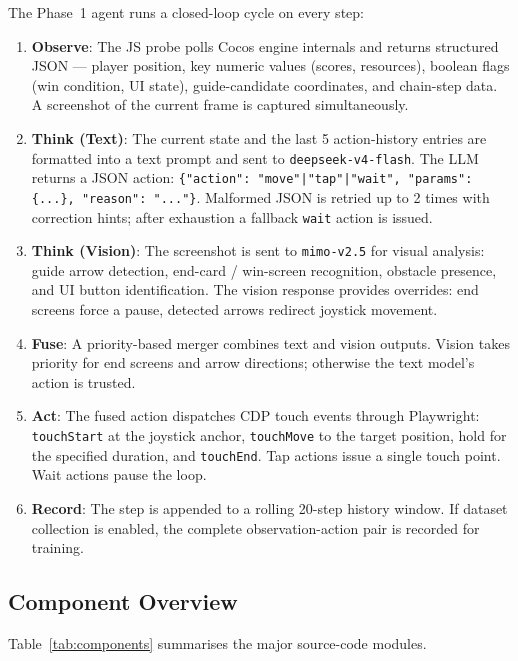 \documentclass[11pt,a4paper]{article}
\begin{document}
The Phase~1 agent runs a closed-loop cycle on every step:

\begin{enumerate}[leftmargin=*,itemsep=2pt]
  \item \textbf{Observe}: The JS probe polls Cocos engine internals and returns structured JSON — player position, key numeric values (scores, resources), boolean flags (win condition, UI state), guide-candidate coordinates, and chain-step data. A screenshot of the current frame is captured simultaneously.
  \item \textbf{Think (Text)}: The current state and the last 5 action-history entries are formatted into a text prompt and sent to \texttt{deepseek-v4-flash}. The LLM returns a JSON action: \texttt{\{"action": "move"|"tap"|"wait", "params": \{...\}, "reason": "..."\}}. Malformed JSON is retried up to 2 times with correction hints; after exhaustion a fallback \texttt{wait} action is issued.
  \item \textbf{Think (Vision)}: The screenshot is sent to \texttt{mimo-v2.5} for visual analysis: guide arrow detection, end-card / win-screen recognition, obstacle presence, and UI button identification. The vision response provides overrides: end screens force a pause, detected arrows redirect joystick movement.
  \item \textbf{Fuse}: A priority-based merger combines text and vision outputs. Vision takes priority for end screens and arrow directions; otherwise the text model's action is trusted.
  \item \textbf{Act}: The fused action dispatches CDP touch events through Playwright: \texttt{touchStart} at the joystick anchor, \texttt{touchMove} to the target position, hold for the specified duration, and \texttt{touchEnd}. Tap actions issue a single touch point. Wait actions pause the loop.
  \item \textbf{Record}: The step is appended to a rolling 20-step history window. If dataset collection is enabled, the complete observation-action pair is recorded for training.
\end{enumerate}

\subsection{Component Overview}

Table~\ref{tab:components} summarises the major source-code modules.
\end{document}
